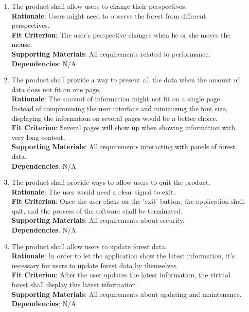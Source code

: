 \documentclass{article}
\begin{document}
\begin{enumerate}[FR1]
\item The product shall allow users to change their perspectives. \\
\textbf{Rationale}: Users might need to observe the forest from different 
perspectives.\\
\textbf{Fit Criterion}: The user's perspective changes when he or she moves the
mouse.\\
\textbf{Supporting Materials}: All requirements related to performance.\\
\textbf{Dependencies}: N/A\\
	
\item  The product shall provide a way to present all the data when
the amount of data does not fit on one page.\\
\textbf{Rationale}: The amount of information might not fit on a single page.
Instead of compromising the user interface and minimizing the font size, 
displaying the information on several pages would be a better choice.\\
\textbf{Fit Criterion}: Several pages will show up when showing information with
very long content.\\
\textbf{Supporting Materials}: All requirements interacting with panels of forest data.\\
\textbf{Dependencies}: N/A\\
	
\item The product shall provide ways to allow users to quit the product.\\
\textbf{Rationale}: The user would need a clear signal to exit.\\
\textbf{Fit Criterion}: Once the user clicks on the 'exit' button, the application shall quit, and the process of the software shall be terminated.\\
\textbf{Supporting Materials}: All requirements about security.\\
\textbf{Dependencies}: N/A\\
    
\item The product shall allow users to update forest data.\\
\textbf{Rationale}: In order to let the application show the latest information,
it's necessary for users to update forest data by themselves.\\
\textbf{Fit Criterion}: After the user updates the latest information, the virtual
forest shall display this latest information. \\
\textbf{Supporting Materials}: All requirements about updating and maintenance.\\
\textbf{Dependencies}: N/A\\
	

\end{enumerate}
\end{document}
